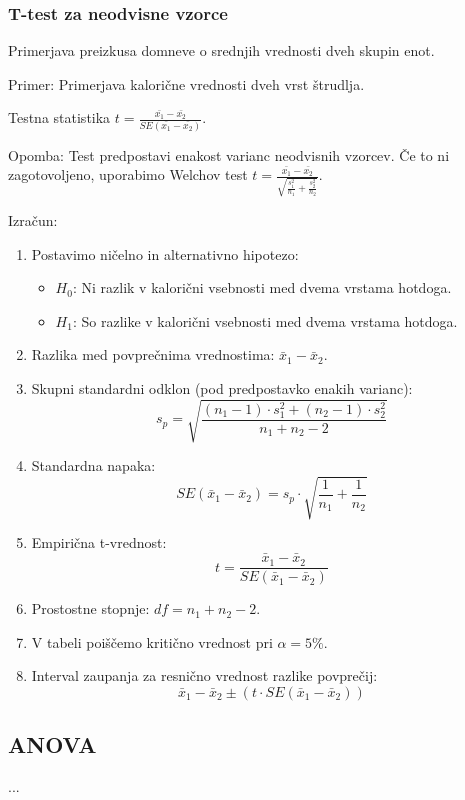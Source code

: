 \subsubsection*{T-test za neodvisne vzorce}

Primerjava preizkusa domneve o srednjih vrednosti dveh skupin enot.

Primer: Primerjava kalorične vrednosti dveh vrst štrudlja.

Testna statistika $t = \frac{\bar{x_1}-\bar{x_2}}{SE(\bar{x_1}-\bar{x_2})}$.

Opomba: Test predpostavi enakost varianc neodvisnih vzorcev. Če to ni zagotovoljeno, uporabimo Welchov test $t = \frac{\bar{x_1}-\bar{x_2}}{\sqrt{\frac{s_1^2}{n_1}+\frac{s_2^2}{n_2}}}$.

Izračun:
\begin{enumerate}
    \item Postavimo ničelno in alternativno hipotezo:
        \begin{itemize}
            \item $H_0$: Ni razlik v kalorični vsebnosti med dvema vrstama hotdoga.
            \item $H_1$: So razlike v kalorični vsebnosti med dvema vrstama hotdoga.
        \end{itemize}
    \item Razlika med povprečnima vrednostima: $\bar{x}_1 - \bar{x}_2$.
    \item Skupni standardni odklon (pod predpostavko enakih varianc):
        \[s_p = \sqrt{\frac{(n_1 - 1) \cdot s_1^2 + (n_2 - 1) \cdot s_2^2}{n_1 + n_2 - 2}}\]
    \item Standardna napaka: 
        \[SE(\bar{x}_1 - \bar{x}_2) = s_p \cdot \sqrt{\frac{1}{n_1} + \frac{1}{n_2}}\]
    \item Empirična t-vrednost: 
        \[t = \frac{\bar{x}_1 - \bar{x}_2}{SE(\bar{x}_1 - \bar{x}_2)}\]
    \item Prostostne stopnje: $df = n_1 + n_2 - 2$.
    \item V tabeli poiščemo kritično vrednost pri $\alpha = 5\%$.
    \item Interval zaupanja za resnično vrednost razlike povprečij: 
        \[\bar{x}_1 - \bar{x}_2 \pm (t \cdot SE(\bar{x}_1 - \bar{x}_2))\]
\end{enumerate}



\subsection*{ANOVA}



\begin{Vaje}{1}
    ...
\end{Vaje}